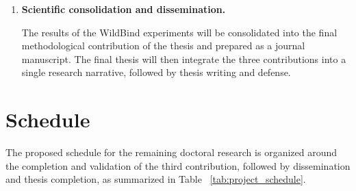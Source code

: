 \begin{enumerate}
\item \textbf{Scientific consolidation and dissemination.}

The results of the WildBind experiments will be consolidated into the final methodological contribution of the thesis and prepared as a journal manuscript. The final thesis will then integrate the three contributions into a single research narrative, followed by thesis writing and defense.

\end{enumerate}

\section{Schedule}\label{sec:sched}

The proposed schedule for the remaining doctoral research is organized around the completion and validation of the third contribution, followed by dissemination and thesis completion, as summarized in Table ~\ref{tab:project_schedule}.

